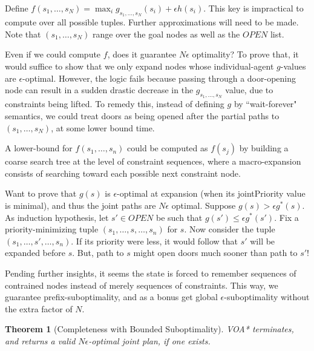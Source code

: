 \documentclass[letterpaper]{article}
\newtheorem{thm}{Theorem}
\begin{document}
Define $f(s_1,\ldots,s_N) = \max_i g_{s_1,\ldots,s_N}(s_i) + \epsilon h(s_i)$. This key is impractical to compute over all possible tuples. Further approximations will need to be made. Note that $(s_1,\ldots,s_N)$ range over the goal nodes as well as the $OPEN$ list.

Even if we could compute $f$, does it guarantee $N\epsilon$ optimality? To prove that, it would suffice to show that we only expand nodes whose individual-agent $g$-values are $\epsilon$-optimal. However, the logic fails because passing through a door-opening node can result in a sudden drastic decrease in the $g_{s_1,\ldots,s_N}$ value, due to constraints being lifted. To remedy this, instead of defining $g$ by ``wait-forever" semantics, we could treat doors as being opened after the partial paths to $(s_1,\ldots,s_N)$, at some lower bound time.

A lower-bound for $f(s_1,\ldots,s_n)$ could be computed as $f(s_j)$ by building a coarse search tree at the level of constraint sequences, where a macro-expansion consists of searching toward each possible next constraint node.

Want to prove that $g(s)$ is $\epsilon$-optimal at expansion (when its jointPriority value is minimal), and thus the joint paths are $N\epsilon$ optimal. Suppose $g(s) > \epsilon g^*(s)$. As induction hypothesis, let $s'\in OPEN$ be such that $g(s') \le \epsilon g^*(s')$. Fix a priority-minimizing tuple $(s_1,\ldots,s,\ldots,s_n)$ for $s$. Now consider the tuple $(s_1,\ldots,s',\ldots,s_n)$. If its priority were less, it would follow that $s'$ will be expanded before $s$. But, path to $s$ might open doors much sooner than path to $s'$!

Pending further insights, it seems the state is forced to remember sequences of contrained nodes instead of merely sequences of constraints. This way, we guarantee prefix-suboptimality, and as a bonus get global $\epsilon$-suboptimality without the extra factor of $N$.

\begin{thm}[Completeness with Bounded Suboptimality]
\label{thm:complete}
VOA* terminates, and returns a valid $N\epsilon$-optimal joint plan, if one exists.
\end{thm}
\end{document}

